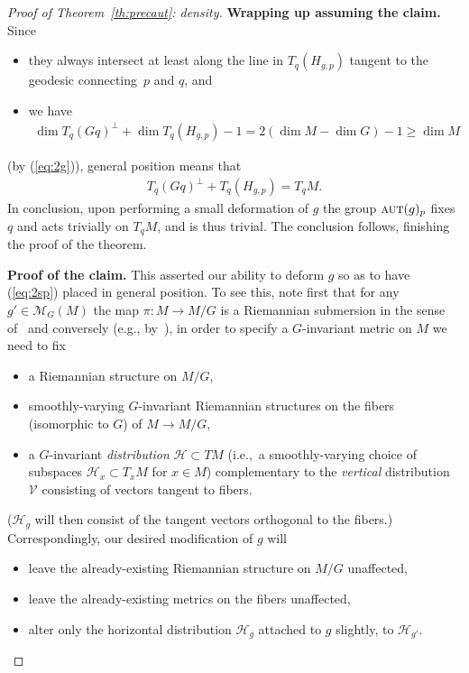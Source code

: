 \documentclass[pdftex]{sigma}%
\numberwithin{equation}{section}
\newcommand{\cat}[1]{\textsc{#1}}
\begin{document}
\begin{proof}[Proof of Theorem~\ref{th:precaut}: density]
 {\bf Wrapping up assuming the claim.} Since
 \begin{itemize}\itemsep=0pt
 \item they always intersect at least along the line in $T_q(H_{g,p})$ tangent to the geodesic connecting~$p$ and $q$, and
 \item we have
 \begin{gather*}
 \dim T_q(Gq)^{\perp} + \dim T_q(H_{g,p}) -1 = 2(\dim M-\dim G)-1\ge \dim M
 \end{gather*}
 \end{itemize}
 (by (\ref{eq:2g})), general position means that
 \begin{gather*}
 T_q(Gq)^{\perp} + T_q(H_{g,p}) = T_qM.
 \end{gather*}
 In conclusion, upon performing a small deformation of $g$ the group $\cat{aut}(g)_p$ fixes $q$ and acts trivially on $T_qM$, and is thus trivial. The conclusion follows, finishing the proof of the theorem.

 {\bf Proof of the claim.} This asserted our ability to deform $g$ so as to have (\ref{eq:2sp}) placed in general position. To see this, note first that for any $g'\in \mathcal{M}_G(M)$ the map $\pi\colon M\to M/G$ is a Riemannian submersion in the sense of~\cite[Definition~9.8]{bes} and conversely (e.g., by~\cite[Section~9.15]{bes}), in order to specify a $G$-invariant metric on $M$ we need to fix
 \begin{itemize}\itemsep=0pt
 \item a Riemannian structure on $M/G$,
 \item smoothly-varying $G$-invariant Riemannian structures on the fibers (isomorphic to $G$) of $M\to M/G$,
 \item a $G$-invariant {\it distribution} $\mathcal{H}\subset TM$ (i.e.,~a smoothly-varying choice of subspaces $\mathcal{H}_x\subset T_xM$ for $x\in M$) complementary to the {\it vertical} distribution $\mathcal{V}$ consisting of vectors tangent to fibers.
 \end{itemize}
 ($\mathcal{H}_g$ will then consist of the tangent vectors orthogonal to the fibers.) Correspondingly, our desired modification of $g$ will
 \begin{itemize}\itemsep=0pt
 \item leave the already-existing Riemannian structure on $M/G$ unaffected,
 \item leave the already-existing metrics on the fibers unaffected,
 \item alter only the horizontal distribution $\mathcal{H}_g$ attached to $g$ slightly, to $\mathcal{H}_{g'}$.
 \end{itemize}


\end{proof}
\end{document}

